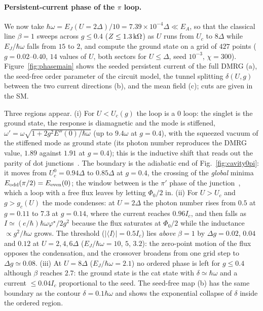 \paragraph*{Persistent-current phase of the $\pi$ loop.}
We now take $\hbar\omega=E_J(U=2\Delta)/10=7.39\times10^{-4}\Delta\ll E_A$, so that the classical line
$\beta=1$ sweeps across $g\le0.4$ ($Z\le1.3\,{\rm k}\Omega$) as $U$ runs from $U_c$ to $8\Delta$ while
$E_J/\hbar\omega$ falls from $15$ to $2$, and compute the ground state on a grid of $427$ points
($g=0.02$--$0.40$, $14$ values of $U$, both sectors for $U\le\Delta$, seed $10^{-3}$, $\chi=300$).
Figure~\ref{fig:phasemain} shows the seeded persistent current of the full DMRG (a), the seed-free order
parameter of the circuit model, the tunnel splitting $\delta(U,g)$ between the two current directions (b),
and the mean field (c); cuts are given in the SM.

Three regions appear. (i) For $U<U_c(g)$ the loop is a $0$ loop: the singlet is the ground state, the
response is diamagnetic and the mode is stiffened, $\omega'=\omega\sqrt{1+2g^2E''(0)/\hbar\omega}$ (up to
$9.4\omega$ at $g=0.4$), with the squeezed vacuum of the stiffened mode as ground state (its photon number
reproduces the DMRG value, $1.89$ against $1.91$ at $g=0.4$); this is the inductive shift that reads out
the parity of dot junctions~\cite{Bargerbos2022,Hays2021}. The boundary is the adiabatic end of
Fig.~\ref{fig:cavity0pi}: it moves from $U_c^0=0.94\Delta$ to $0.85\Delta$ at $g=0.4$, the crossing of
the \emph{global} minima $E_{\rm odd}(\pi/2)=E_{\rm even}(0)$; the window between is the $\pi'$ phase of the
junction~\cite{Vecino2003,Karrasch2008}, which a loop with a free flux leaves by letting $\Phi_0/2$ in.
(ii) For $U>U_c$ and $g>g_c(U)$ the mode condenses: at $U=2\Delta$ the photon number rises from $0.5$ at
$g=0.11$ to $7.3$ at $g=0.14$, where the current reaches $0.96I_c$, and then falls as
$I\simeq(e/\hbar)\hbar\omega\varphi^\star/2g^2$ because the flux saturates at $\Phi_0/2$ while the inductance
$\propto g^2/\hbar\omega$ grows. The threshold ($|\langle I\rangle|=0.5I_c$) lies \emph{above} $\beta=1$ by
$\Delta g=0.02$, $0.04$ and $0.12$ at $U=2,4,6\Delta$ ($E_J/\hbar\omega=10$, $5$, $3.2$): the zero-point
motion of the flux opposes the condensation, and the crossover broadens from one grid step to
$\Delta g\simeq0.08$. (iii) At $U=8\Delta$ ($E_J/\hbar\omega=2.1$) no ordered phase is left for $g\le0.4$
although $\beta$ reaches $2.7$: the ground state is the cat state with $\delta\simeq\hbar\omega$ and a current
$\le0.04I_c$ proportional to the seed. The seed-free map (b) has the same boundary as the contour $\delta=0.1\hbar\omega$ and shows the exponential
collapse of $\delta$ inside the ordered region.


